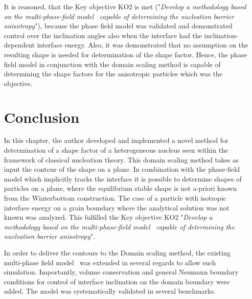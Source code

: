 It is reasoned, that the Key objective KO2 is met ("\textit{Develop a methodology based on the multi-phase-field model~\cite{Moelans2008} capable of determining the nucleation barrier anisotropy}"), because the phase field model was validated and demonstrated control over the inclination angles also when the interface had the inclination-dependent interface energy. Also, it was demonstrated that no assumption on the resulting shape is needed for determination of the shape factor. Hence, the phase field model in conjunction with the domain scaling method is capable of determining the shape factors for the anisotropic particles which was the objective.

\section{Conclusion}
In this chapter, the author developed and implemented a novel method for determination of a shape factor of a heterogeneous nucleus seen within the framework of classical nucleation theory. This domain scaling method takes as input the contour of the shape on a plane. In combination with the phase-field model which implicitly tracks the interface it is possible to determine shapes of particles on a plane, where the equilibrium stable shape is not a-priori known from the Winterbottom construction. The case of a particle with isotropic interface energy on a grain boundary where the analytical solution was not known was analyzed. This fulfilled the Key objective KO2 "\textit{Develop a methodology based on the multi-phase-field model~\cite{Moelans2008} capable of determining the nucleation barrier anisotropy}".

In order to deliver the contours to the Domain scaling method, the existing multi-phase field model~\cite{Moelans2008, Minar2022} was extended in several regards to allow such simulation. Importantly, volume conservation and general Neumann boundary conditions for control of interface inclination on the domain boundary were added. The model was systematically validated in several benchmarks.


